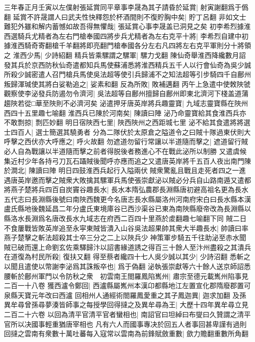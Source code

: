 三年春正月壬寅以左僕射張延賞同平章事李晟為其子請昏於延賞|{
	射寅謝翻爲于僞翻}
延賞不許晟謂人曰武夫性快釋怨於杯酒間則不復貯胸中矣|{
	貯丁呂翻}
非如文士難犯外雖和解内蓄憾如故吾得無懼哉|{
	張延賞心事李晟盖已洞見之矣}
初李希烈據淮西選騎兵尤精者為左右門槍奉國四將步兵尤精者為左右克平十將|{
	李希烈自建中初據淮西騎奇寄翻槍千羊翻將即亮翻門槍奉國各分左右凡四將左右克平軍則分十將領之}
淮西少馬|{
	少詩紹翻}
精兵皆乘騾謂之騾軍|{
	騾力戈翻}
陳仙奇舉淮西降纔數月詔發其兵於京西防秋仙奇遣都知兵馬使蘇浦悉將淮西精兵五千人以行會仙奇為吳少誠所殺少誠密遣人召門槍兵馬使吳法超等使引兵歸浦不之知法超等引步騎四千自鄜州叛歸渾瑊使其將白娑勒追之|{
	娑素和翻}
反為所敗|{
	敗補邁翻}
丙午上急遣中使敇陜虢觀察使李泌發兵防遏勿令濟河|{
	吳法超等自鄜州擅歸自鄜州即東北濟河下棧盖道蒲趨陜若從□華至陜則不必濟河矣}
泌遣押牙唐英岸將兵趣靈寶|{
	九域志靈寶縣在陜州西四十五里趣七喻翻}
淮西兵已陳於河南矣|{
	陳讀曰陣}
泌乃命靈寶給其食淮西兵亦不敢剽掠|{
	剽匹妙翻}
明日宿陜西七里|{
	陜西陜州之西距城七里}
泌不給其食遣將將選士四百人|{
	選士簡選其驍勇者}
分為二隊伏於太原倉之隘道令之曰賊十隊過東伏則大呼擊之西伏亦大呼應之|{
	呼火故翻}
勿遮道勿留行常讓以半道隨而擊之|{
	遮道留行賊必人自為戰讓以半道隨而擊之前者得脱後者務進心不在戰此泌所以制勝}
又遣虞候集近村少年各持弓刀瓦石躡賊後聞呼亦應而追之又遣唐英岸將千五百人夜出南門陳於澗北|{
	陳讀曰陣}
明日四鼓淮西兵起行入隘兩伏賊衆驚亂且戰且走死者四之一進遇唐英岸邀而擊之賊衆大敗擒其騾軍兵馬使張崇獻泌以賊必分兵自山路南遁又遣都將燕子楚將兵四百自炭竇谷趣長水|{
	長水本隋弘農郡長淵縣唐初避高祖名更為長水五代志曰長淵縣後號曰南陜西魏更今名唐志長水縣屬洛州河南府宋白曰長水縣本漢盧氏縣地後魏延昌二年分盧氏東境庫谷已西沙渠谷已東為南陜縣廢帝改為長淵縣以縣洛水長淵爲名唐改長水九域志在府西二百四十里燕於䖍翻趣七喻翻下同}
賊二日不食屢戰皆敗英岸追至永寜東賊皆潰入山谷吳法超果帥其衆大半趣長水|{
	帥讀曰率}
燕子楚擊之斬法超殺其士卒三分之二上以陜兵少神策軍步騎五千往助泌至赤水聞賊已破而還上命劉玄佐乘驛歸汴以詔書緣道誘之得百三十餘人至汴州盡殺之其潰兵在道復為村民所殺|{
	復扶又翻}
得至蔡者纔四十七人吳少誠以其少|{
	少詩沼翻}
悉斬之以聞且遣使以幣謝李泌爲其誅叛卒也|{
	爲于偽翻}
泌執張崇獻等六十餘人送京師詔悉腰斬於鄜州軍門以令防秋之衆　初雲南王閤羅鳳陷嶲州|{
	肅宗至德元載嶲州陷事見二百一十八卷}
獲西瀘令鄭回|{
	西瀘縣屬嶲州本漢卬都縣地江左置宣化郡隋廢郡置可泉縣天寶元年改曰西瀘}
回相州人通經術閤羅鳳愛重之其子鳳迦異|{
	迦求加翻}
及孫異牟尋曾孫尋夢湊皆師事之每授學回得撻之及異牟尋為王|{
	大歷十四年異牟尋立見二百二十六卷}
以回為清平官清平官者蠻相也|{
	南詔官曰坦綽曰布燮曰久贊謂之清平官所以决國事輕重猶唐宰相也}
凡有六人而國事專决於回五人者事回甚卑謹有過則回撻之雲南有衆數十萬吐蕃每入寇常以雲南為前鋒賦斂重數|{
	歛力贍翻重數所角翻}
